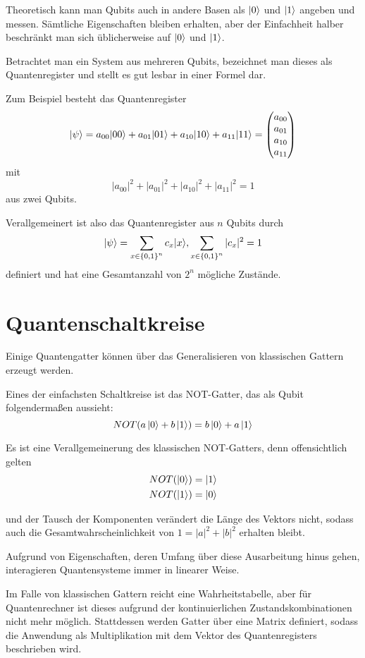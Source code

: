 \documentclass{acm_proc_article-sp}
\begin{document}
Theoretisch kann man Qubits auch in andere Basen als $\left|0\right\rangle$ und $\left|1\right\rangle$ angeben und messen. Sämtliche Eigenschaften
bleiben erhalten, aber der Einfachheit halber beschränkt man sich üblicherweise auf $\left|0\right\rangle$ und $\left|1\right\rangle$.


Betrachtet man ein System aus mehreren Qubits, bezeichnet man dieses als Quantenregister und stellt es
gut lesbar in einer Formel dar.

Zum Beispiel besteht das Quantenregister 
\[
    \left|\psi\right\rangle = a_{00} |00\rangle + a_{01} |01\rangle + a_{10} |10\rangle + a_{11} |11\rangle = 
\begin{pmatrix}
    a_{00}  \\
    a_{01}  \\
    a_{10}  \\
    a_{11}  \\
\end{pmatrix}
\]
mit
\[
    |a_{00}|^2 + |a_{01}|^2 + |a_{10}|^2 + |a_{11}|^2 = 1
\]
aus zwei Qubits.

Verallgemeinert ist also das Quantenregister aus $n$ Qubits durch
\[
    \left|\psi\right\rangle = \sum_{x \in {\{0,1\}}^n} c_{x} |x\rangle,
    \sum_{x \in {\{0,1\}}^n} |c_x|^2 = 1
\]
definiert und hat eine Gesamtanzahl von $2^n$ mögliche Zustände.

\section{Quantenschaltkreise}
\label{qcircuits}

Einige Quantengatter können über das Generalisieren von klassischen Gattern erzeugt werden.

Eines der einfachsten Schaltkreise ist das NOT-Gatter, das als Qubit folgendermaßen aussieht:
    \[NOT(a \left|0\right\rangle + b \left|1\right\rangle)  = b \left|0\right\rangle + a \left|1\right\rangle\]

Es ist eine Verallgemeinerung des klassischen NOT-Gatters, denn offensichtlich gelten
\begin{eqnarray*}
    NOT(\left|0\right\rangle) = \left|1\right\rangle \\
    NOT(\left|1\right\rangle) = \left|0\right\rangle
\end{eqnarray*}

und der Tausch der Komponenten verändert die Länge des Vektors nicht, sodass auch die Gesamtwahrscheinlichkeit
von $1 = |a|^2 + |b|^2$ erhalten bleibt.

Aufgrund von Eigenschaften, deren Umfang über diese Ausarbeitung hinus gehen, interagieren Quantensysteme immer 
in linearer Weise.

Im Falle von klassischen Gattern reicht eine Wahrheitstabelle, aber für Quantenrechner ist
dieses aufgrund der kontinuierlichen Zustandskombinationen nicht mehr möglich. Stattdessen werden Gatter über eine Matrix definiert,
sodass die Anwendung als Multiplikation mit dem Vektor des Quantenregisters beschrieben wird.
\end{document}

